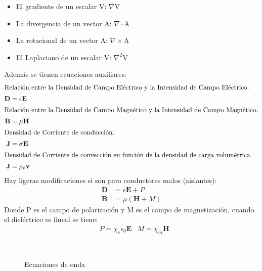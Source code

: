 \documentclass[11pt,fleqn,a4paper,]{LegrandOrangeBook}
\begin{document}
\begin{itemize}
\item El gradiente de un escalar V: $\nabla$V
\item La divergencia de un vector A: $\nabla\cdot$A
\item La rotacional de un vector A: $\nabla\times$A
\item El Laplaciano de un escalar V: $\nabla^2$V
\end{itemize}
Además se tienen ecuaciones auxiliares:
\begin{subequations}
\begin{align}
\intertext{Relación entre la Densidad de Campo Eléctrico y la Intensidad de Campo Eléctrico.}
\textbf{D}&= \epsilon \textbf{E}\\
\intertext{Relación entre la Densidad de Campo Magnético y la Intensidad de Campo Magnético.}
\textbf{B}&=\mu\textbf{H}\\
\intertext{Densidad de Corriente de conducción.}
\textbf{J}&=\sigma\textbf{E}\\
\intertext{Densidad de Corriente de convección en función de la densidad de carga volumétrica.}
\textbf{J}&=\rho_v\textbf{v}
\end{align}
\end{subequations}
Hay ligeras modificaciones si son para conductores malos (aislantes):
\begin{subequations}
\begin{align}
\textbf{D}&= \epsilon \textbf{E} + P\\
\textbf{B}&=\mu(\textbf{H} + M)
\end{align}
\end{subequations}
Donde P es el campo de polarización y M es el campo de magnetización, cuando el dieléctrico es lineal se tiene:
\begin{align*}
&P=\chi_e\epsilon_0\textbf{E} &M=\chi_m\textbf{H}
\end{align*}
\begin{figure}[H]
\centering
{}\\
\caption{Ecuaciones de onda}
\end{figure}
\end{document}
